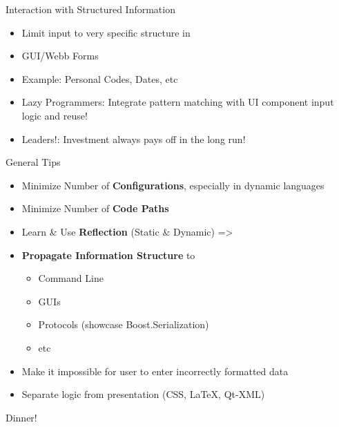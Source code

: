 \documentclass[xcolor=dvipsnames]{beamer}
\begin{document}
\begin{frame}[fragile]{Interaction with Structured Information}
  \begin{itemize}[<+->]
  \item Limit input to very specific structure in
  \item GUI/Webb Forms
  \item Example: Personal Codes, Dates, etc
  \item Lazy Programmers: Integrate pattern matching with UI component input
    logic and reuse!
  \item Leaders!: Investment always pays off in the long run!
  \end{itemize}
\end{frame}

\begin{frame}[fragile]{General Tips}
  \begin{itemize}[<+->]
  \item Minimize Number of \textbf{Configurations}, especially in dynamic languages
  \item Minimize Number of \textbf{Code Paths}
  \item Learn \& Use \textbf{Reflection} (Static \& Dynamic) =>
  \item \textbf{Propagate Information Structure} to
    \begin{itemize}[<+->]
    \item Command Line
    \item GUIs
    \item Protocols (showcase Boost.Serialization)
    \item etc
    \end{itemize}
  \item Make it impossible for user to enter incorrectly formatted data
  \item Separate logic from presentation (CSS, LaTeX, Qt-XML)
  \end{itemize}
\end{frame}

\begin{frame}[fragile]{Dinner!}
  \begin{figure}
  \end{figure}
\end{frame}
\end{document}
